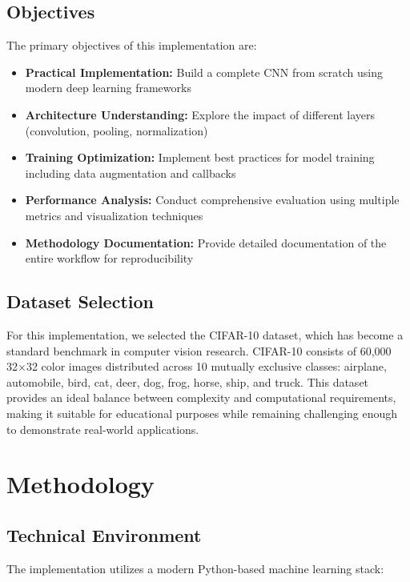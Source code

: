 \documentclass[11pt,a4paper]{article}
\begin{document}
\subsection{Objectives}

The primary objectives of this implementation are:

\begin{itemize}
    \item \textbf{Practical Implementation:} Build a complete CNN from scratch using modern deep learning frameworks
    \item \textbf{Architecture Understanding:} Explore the impact of different layers (convolution, pooling, normalization)
    \item \textbf{Training Optimization:} Implement best practices for model training including data augmentation and callbacks
    \item \textbf{Performance Analysis:} Conduct comprehensive evaluation using multiple metrics and visualization techniques
    \item \textbf{Methodology Documentation:} Provide detailed documentation of the entire workflow for reproducibility
\end{itemize}

\subsection{Dataset Selection}

For this implementation, we selected the CIFAR-10 dataset, which has become a standard benchmark in computer vision research. CIFAR-10 consists of 60,000 32×32 color images distributed across 10 mutually exclusive classes: airplane, automobile, bird, cat, deer, dog, frog, horse, ship, and truck. This dataset provides an ideal balance between complexity and computational requirements, making it suitable for educational purposes while remaining challenging enough to demonstrate real-world applications.

\section{Methodology}

\subsection{Technical Environment}

The implementation utilizes a modern Python-based machine learning stack:
\end{document}

